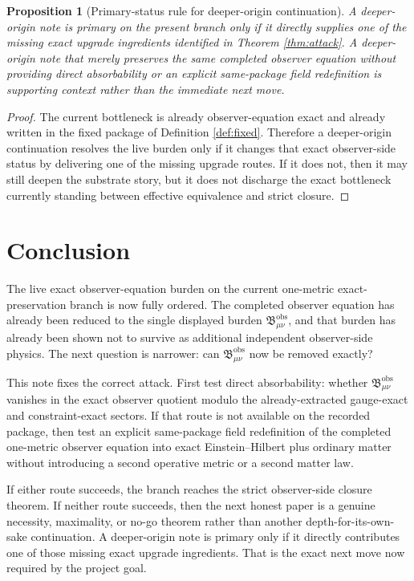 \documentclass[11pt]{article}
\newcommand{\ObsBurden}{\mathfrak B_{\mu\nu}^{\mathrm{obs}}}
\newtheorem{proposition}{Proposition}
\begin{document}
\begin{proposition}[Primary-status rule for deeper-origin continuation]
\label{prop:depth}
A deeper-origin note is primary on the present branch only if it directly supplies one of the missing exact upgrade ingredients identified in Theorem \ref{thm:attack}. A deeper-origin note that merely preserves the same completed observer equation without providing direct absorbability or an explicit same-package field redefinition is supporting context rather than the immediate next move.
\end{proposition}

\begin{proof}
The current bottleneck is already observer-equation exact and already written in the fixed package of Definition \ref{def:fixed}. Therefore a deeper-origin continuation resolves the live burden only if it changes that exact observer-side status by delivering one of the missing upgrade routes. If it does not, then it may still deepen the substrate story, but it does not discharge the exact bottleneck currently standing between effective equivalence and strict closure.
\end{proof}

\section{Conclusion}

The live exact observer-equation burden on the current one-metric exact-preservation branch is now fully ordered. The completed observer equation has already been reduced to the single displayed burden \(\ObsBurden\), and that burden has already been shown not to survive as additional independent observer-side physics. The next question is narrower: can \(\ObsBurden\) now be removed exactly?

This note fixes the correct attack. First test direct absorbability: whether \(\ObsBurden\) vanishes in the exact observer quotient modulo the already-extracted gauge-exact and constraint-exact sectors. If that route is not available on the recorded package, then test an explicit same-package field redefinition of the completed one-metric observer equation into exact Einstein--Hilbert plus ordinary matter without introducing a second operative metric or a second matter law.

If either route succeeds, the branch reaches the strict observer-side closure theorem. If neither route succeeds, then the next honest paper is a genuine necessity, maximality, or no-go theorem rather than another depth-for-its-own-sake continuation. A deeper-origin note is primary only if it directly contributes one of those missing exact upgrade ingredients. That is the exact next move now required by the project goal.
\end{document}
